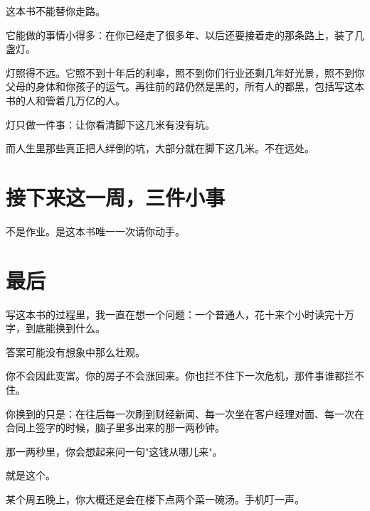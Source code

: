 这本书不能替你走路。

它能做的事情小得多：在你已经走了很多年、以后还要接着走的那条路上，装了几盏灯。

灯照得不远。它照不到十年后的利率，照不到你们行业还剩几年好光景，照不到你父母的身体和你孩子的运气。再往前的路仍然是黑的，所有人的都黑，包括写这本书的人和管着几万亿的人。

灯只做一件事：让你看清脚下这几米有没有坑。

而人生里那些真正把人绊倒的坑，大部分就在脚下这几米。不在远处。

\section{接下来这一周，三件小事}

不是作业。是这本书唯一一次请你动手。

\begin{flowlist}
\end{flowlist}

\section{最后}

写这本书的过程里，我一直在想一个问题：一个普通人，花十来个小时读完十万字，到底能换到什么。

答案可能没有想象中那么壮观。

你不会因此变富。你的房子不会涨回来。你也拦不住下一次危机，那件事谁都拦不住。

你换到的只是：在往后每一次刷到财经新闻、每一次坐在客户经理对面、每一次在合同上签字的时候，脑子里多出来的那一两秒钟。

那一两秒里，你会想起来问一句"这钱从哪儿来"。

就是这个。

\bookbreak

某个周五晚上，你大概还是会在楼下点两个菜一碗汤。手机叮一声。

